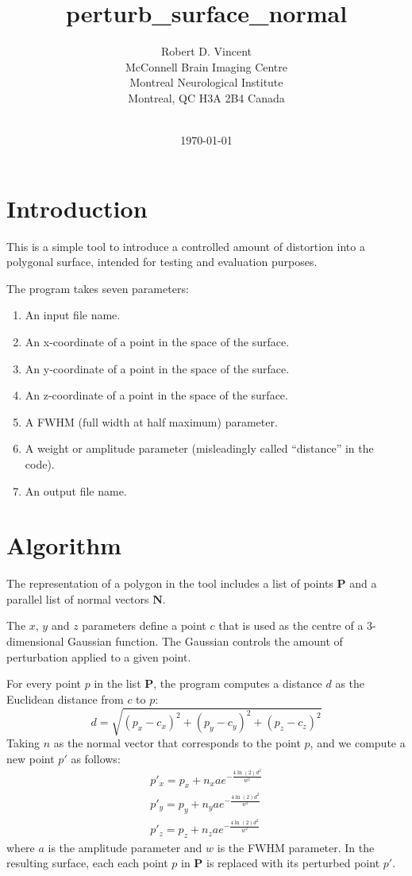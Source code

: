 \documentclass{article}
\title{perturb\_surface\_normal}
\author{Robert D. Vincent \\
McConnell Brain Imaging Centre \\
Montreal Neurological Institute \\
Montreal, QC H3A 2B4 Canada \\~\\
}
\date{\today}
\begin{document}
\maketitle

\section{Introduction}
This is a simple tool to introduce a controlled amount of distortion
into a polygonal surface, intended for testing and evaluation purposes.

The program takes seven parameters:
\begin{enumerate}
\item An input file name.
  \item An x-coordinate of a point in the space of the surface.
  \item An y-coordinate of a point in the space of the surface.
  \item An z-coordinate of a point in the space of the surface.
  \item A FWHM (full width at half maximum) parameter.
  \item A weight or amplitude parameter (misleadingly called
    ``distance'' in the code).
  \item An output file name.
\end{enumerate}

\section{Algorithm}
The representation of a polygon in the tool includes a list of
points $\mathbf{P}$ and a parallel list of normal vectors $\mathbf{N}$.

The $x$, $y$ and $z$ parameters define a point $c$ that
is used as the centre of a 3-dimensional Gaussian function. The Gaussian
controls the amount of perturbation applied to a given point.

For every point $p$ in the list $\mathbf{P}$, the
program computes a distance $d$ as the Euclidean distance from $c$ to
$p$:
\begin{equation}
  d = \sqrt{(p_x - c_x)^2 + (p_y - c_y)^2 + (p_z - c_z)^2}
\end{equation}
Taking $n$ as the normal vector that corresponds to the point $p$,
and we compute a new point $p'$ as follows:
\begin{eqnarray}
  p'_x = p_x + n_x a e^{-\frac{4\ln(2) d^2}{w^2}}\\
  p'_y = p_y + n_y a e^{-\frac{4\ln(2) d^2}{w^2}}\\
  p'_z = p_z + n_z a e^{-\frac{4\ln(2) d^2}{w^2}}
\end{eqnarray}
where $a$ is the amplitude parameter and $w$ is the FWHM parameter. In the
resulting surface, each 
each point $p$ in $\mathbf{P}$ is replaced with its perturbed point $p'$.
\end{document}
